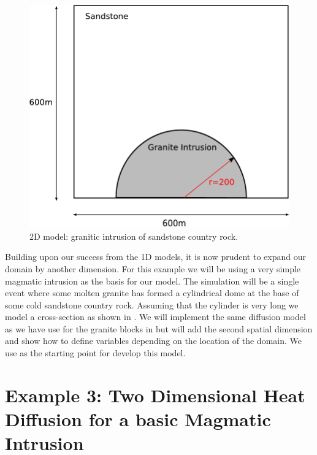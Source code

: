 
%
%
%

\begin{figure}[t]
\centerline{\includegraphics[width=4.in]{figures/twodheatdiff}}
\caption{2D model: granitic intrusion of sandstone country rock.}
\label{fig:twodhdmodel}
\end{figure}


Building upon our success from the 1D models, it is now prudent to expand our domain by another dimension. 
For this example we will be using a very simple magmatic intrusion as the basis for our model. The simulation will be a single event where some molten granite has formed a cylindrical dome at the base of some cold sandstone country rock. Assuming that the cylinder is very long 
we model a cross-section as shown in . We will implement the same 
diffusion model as we have use for the granite blocks in 
but will add the second spatial dimension and show how to define 
variables depending on the location of the domain. 
We use  as the starting point for develop this model. 

\section{Example 3: Two Dimensional Heat Diffusion for a basic Magmatic Intrusion}
\label{Sec:2DHD}


